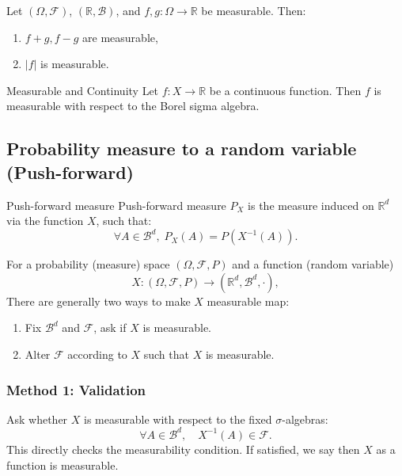 \begin{prop}
\noindent Let \( (\Omega, \mathscr{F}) \), \( (\mathbb{R}, \mathscr{B}) \), and \( f, g: \Omega \to \mathbb{R} \) be measurable. Then:
\begin{enumerate}
    \item \( f+g, f-g \) are measurable,
    \item \( |f| \) is measurable.
\end{enumerate}	
\end{prop}

\begin{prop}{Measurable and Continuity}
\noindent Let \( f: X \to \mathbb{R} \) be a continuous function. Then \( f \) is measurable with respect to the Borel sigma algebra.
\end{prop}

\subsection{Probability measure to a random variable (Push-forward)}

\begin{df}{Push-forward measure}
Push-forward measure \( P_X \) is the measure induced on \( \mathbb{R}^d \) via the function \( X \), such that:
\[
\forall A \in \mathscr{B}^d, \; P_X(A) = P(X^{-1}(A)).
\]
\end{df}

\noindent For a probability (measure) space \((\Omega, \mathscr{F}, P)\) and a function (random variable) 
\[
X: (\Omega, \mathscr{F}, P) \to (\mathbb{R}^d, \mathscr{B}^d, \cdot),
\]
There are generally two ways to make $X$ measurable map: 
\begin{enumerate}
	\item Fix $\mathscr{B}^d$ and $\mathscr{F}$, ask if $X$ is measurable. 
	\item Alter $\mathscr{F}$ according to $X$ such that $X$ is measurable. 
\end{enumerate}

\subsubsection{Method 1: Validation}

Ask whether \( X \) is measurable with respect to the fixed \(\sigma\)-algebras:
\[
\forall A \in \mathscr{B}^d, \quad X^{-1}(A) \in \mathscr{F}.
\]
\noindent This directly checks the measurability condition. If satisfied, we say then \( X \) as a function is measurable.

